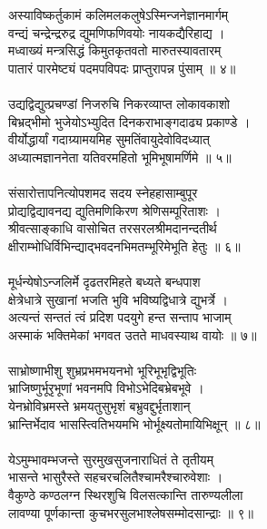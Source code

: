 अस्याविष्कर्तुकामं कलिमलकलुषेऽस्मिन्जनेज्ञानमार्गम्\\
     वन्द्यं चन्द्रेन्द्ररुद्र द्युमणिफणिवयोः नायकद्यैरिहाद्य ।\\
मध्वाख्यं मन्त्रसिद्धं किमुतकृतवतो मारुतस्यावतारम्\\
     पातारं पारमेष्ट्यं पदमपविपदः प्राप्तुरापन्न पुंसाम् ॥ ४॥\\
\\
उद्यद्विद्युत्प्रचण्डां निजरुचि निकरव्याप्त लोकावकाशो\\
     बिभ्रद्भीमो भुजेयोऽभ्युदित दिनकराभाङ्गदाढ्य प्रकाण्डे ।\\
वीर्योद्धार्यां गदाग्र्यामयमिह सुमतिंवायुदेवोविदध्यात्\\
     अध्यात्मज्ञाननेता यतिवरमहितो भूमिभूषामर्णिमे ॥ ५॥\\
\\
संसारोत्तापनित्योपशमद सदय स्नेहहासाम्बुपूर\\
     प्रोद्यद्विद्यावनद्य द्युतिमणिकिरण श्रेणिसम्पूरिताशः ।\\
श्रीवत्साङ्काधि वासोचित तरसरलश्रीमदानन्दतीर्थ\\
     क्षीराम्भोधिर्विभिन्द्याद्भवदनभिमतम्भूरिमेभूति हेतुः ॥ ६॥\\
\\
मूर्धन्येषोऽन्जलिर्मे दृढतरमिहते बध्यते बन्धपाश\\
     क्षेत्रेधात्रे सुखानां भजति भुवि भविष्यद्विधात्रे द्युभर्त्रे ।\\
अत्यन्तं सन्ततं त्वं प्रदिश पदयुगे हन्त सन्ताप भाजाम्\\
     अस्माकं भक्तिमेकां भगवत उतते माधवस्याथ वायोः ॥ ७॥\\
\\
साभ्रोष्णाभीशु शुभ्रप्रभमभयनभो भूरिभूभृद्विभूतिः\\
     भ्राजिष्णुर्भूरृभूणां भवनमपि विभोऽभेदिबभ्रेबभूवे ।\\
येनभ्रोविभ्रमस्ते भ्रमयतुसुभृशं बभ्रुवद्दुर्भृताशान्\\
     भ्रान्तिर्भेदाव भासस्त्वितिभयमभि भोर्भूक्ष्यतोमायिभिक्षून् ॥ ८॥\\
\\
येऽमुम्भावम्भजन्ते सुरमुखसुजनाराधितं ते तृतीयम्\\
     भासन्ते भासुरैस्ते सहचरचलितैश्चामरैश्चारुवेशाः ।\\
वैकुण्ठे कण्ठलग्न स्थिरशुचि विलसत्कान्ति तारुण्यलीला\\
     लावण्या पूर्णकान्ता कुचभरसुलभाश्लेषसम्मोदसान्द्राः ॥ ९॥\\
\\
